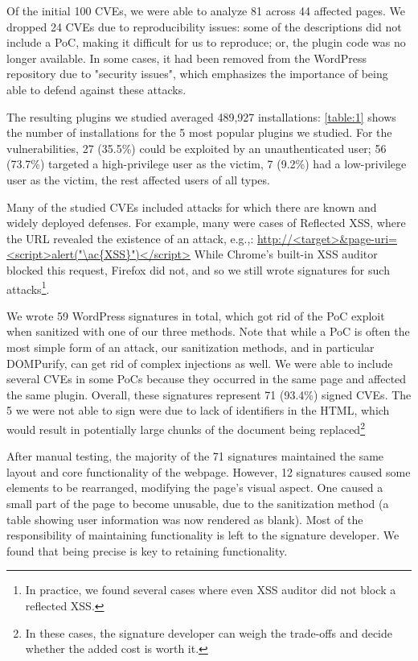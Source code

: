 Of the initial 100 CVEs, we were able to analyze 81 across 44 affected
pages. We dropped 24 CVEs due to reproducibility issues: some of the
descriptions did not include a PoC, making it difficult for us to
reproduce; or, the plugin code was no longer available. In some cases,
it had been removed from the WordPress repository due to "security
issues", which emphasizes the importance of being able to defend
against these attacks. %

The resulting plugins we studied averaged 489,927
installations: \autoref{table:1} shows the number of installations for
the 5 most popular plugins we studied. For the vulnerabilities, 27
(35.5\%) could be exploited by an unauthenticated user; 56 (73.7\%)
targeted a high-privilege user as the victim, 7 (9.2\%) had a
low-privilege user as the victim, the rest affected users of all
types.

Many of the studied CVEs included attacks for which there are known
and widely deployed defenses. For example, many were cases of
Reflected \ac{XSS}, where the URL revealed the existence of an attack,
e.g.,: \url{http://<target>&page-uri=<script>alert("\ac{XSS}")</script>}
While Chrome's built-in \ac{XSS} auditor blocked this request, Firefox
did not, and so we still wrote signatures for such attacks\footnote{In
practice, we found several cases where even XSS auditor did not block
a reflected XSS.}.

We wrote 59 WordPress signatures in total, which got rid of the PoC
exploit when sanitized with one of our three methods. Note that while
a PoC is often the most simple form of an attack, our sanitization
methods, and in particular DOMPurify, can get rid of complex
injections as well. We were able to include several CVEs in some PoCs
because they occurred in the same page and affected the same
plugin. Overall, these signatures represent 71 (93.4\%) signed
CVEs. The 5 we were not able to sign were due to lack of identifiers
in the HTML, which would result in potentially large chunks of the
document being replaced\footnote{In these cases, the signature developer
can weigh the trade-offs and decide whether the added cost is worth
it.}

After manual testing, the majority of the 71 signatures maintained the
same layout and core functionality of the webpage. However, 12
signatures caused some elements to be rearranged, modifying the page's
visual aspect. One caused a small part of the page to become unusable,
due to the sanitization method (a table showing user information
was now rendered as blank). Most of the responsibility of maintaining
functionality is left to the signature developer. We found that being precise
is key to retaining functionality.

